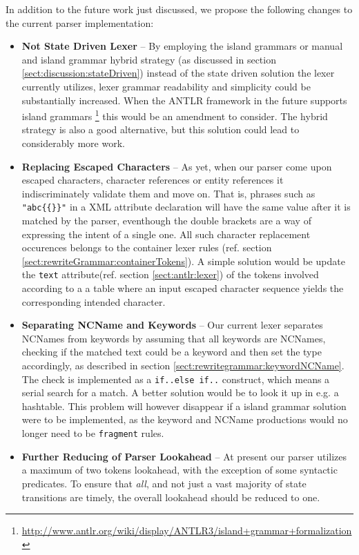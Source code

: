 In addition to the future work just discussed, we propose the following changes
to the current parser implementation:
\begin{itemize}
\item \textbf{Not State Driven Lexer} -- By employing the island grammars or
manual and island grammar hybrid strategy (as discussed in section
\ref{sect:discussion:stateDriven}) instead of the state driven solution the
lexer currently utilizes, lexer grammar readability and simplicity could be
substantially increased. When the ANTLR framework in the future supports island
grammars
\footnote{\url{http://www.antlr.org/wiki/display/ANTLR3/island+grammar+formalization}}
this would be an amendment to consider. The hybrid strategy is also a
good alternative, but this solution could lead to considerably more
work.

\item \textbf{Replacing Escaped Characters} -- As yet, when our parser come
upon escaped characters, character references or entity references it
indiscriminately validate them and move on. That is, phrases such as
\verb!"abc{{}}"! in a XML attribute declaration will have the same value after
it is matched by the parser, eventhough the double brackets are a way of
expressing the intent of a single one. All such character replacement
occurences belongs to the container lexer rules (ref. section
\ref{sect:rewriteGrammar:containerTokens}). A simple solution would be update
the \verb!text! attribute(ref. section \ref{sect:antlr:lexer}) of the tokens
involved according to a a table where an input escaped character sequence
yields the corresponding intended character.

\item \textbf{Separating NCName and Keywords} -- Our current lexer separates
NCNames from keywords by assuming that all keywords are NCNames, checking if
the matched text could be a keyword and then set the type accordingly, as
described in section \ref{sect:rewritegrammar:keywordNCName}. The check is
implemented as a \verb!if..else if..! construct, which means a serial search
for a match. A better solution would be to look it up in e.g. a hashtable. This
problem will however disappear if a island grammar solution were to be
implemented, as the keyword and NCName productions would no longer need to be
\verb!fragment! rules.

\item \textbf{Further Reducing of Parser Lookahead} -- At present our parser utilizes a maximum of two tokens lookahead, with the exception of some syntactic predicates. To ensure that \emph{all}, and not just a vast majority of state transitions are timely, the overall lookahead should be reduced to one.


\end{itemize}
